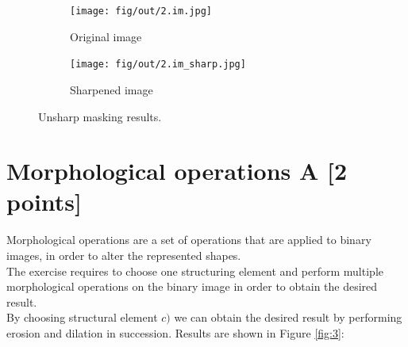 \documentclass[tikz,14pt,fleqn]{article}
\begin{document}
\begin{figure}[h!]
    \begin{subfigure}[b]{0.5\linewidth}
        \centering
    \texttt{[image: fig/out/2.im.jpg]}
    \caption{Original image}
    \end{subfigure}
    \begin{subfigure}[b]{0.5\linewidth}
        \centering
        \texttt{[image: fig/out/2.im\_sharp.jpg]}
        \caption{Sharpened image}
    \end{subfigure}
    \caption{Unsharp masking results.}
    \label{fig:2.4}
\end{figure}
\section{Morphological operations A [2 points]}
Morphological operations are a set of operations that are applied to binary images, in order to alter the represented shapes.\\
The exercise requires to choose one structuring element and perform multiple morphological operations on the binary image in order to obtain the desired result.\\
By choosing structural element $c)$ we can obtain the desired result by performing erosion and dilation in succession. Results are shown in Figure \ref{fig:3}:
\end{document}

